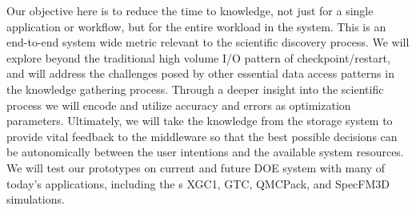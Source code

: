 \documentclass[11pt,letterpaper]{article}
\begin{document}


  \setlength{\parindent}{0.5cm}



%
Our objective here is to reduce the time to knowledge, not just for a single
application or workflow, but for the entire workload in the system. This is
an end-to-end system wide metric relevant to the scientific discovery
process. We will explore beyond the traditional high volume I/O pattern of
checkpoint/restart, and will address the challenges posed by other essential
data access patterns in the knowledge gathering process.  Through a deeper
insight into the scientific process we will encode and utilize accuracy and
errors as optimization parameters. 
Ultimately, we will take the knowledge from the storage system to provide vital feedback to the middleware 
so that the best possible decisions can be autonomically  between the user intentions and
the available system resources.  
We will test our prototypes  on current and future DOE system with many of today's applications, including the
s XGC1, GTC, QMCPack, and SpecFM3D simulations. 



\end{document}

